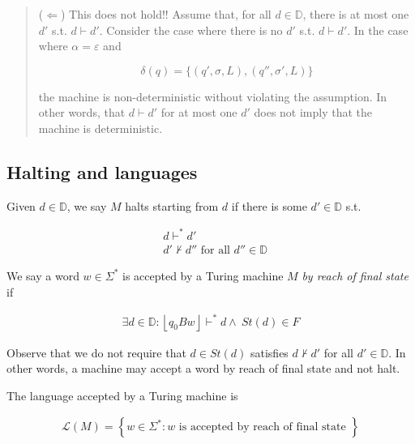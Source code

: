 \documentclass[a4paper, 12pt]{article}
\begin{document}
\begin{quote}
($\Leftarrow$) This does not hold!! Assume that, for all $d \in \mathbb{D}$,
there is at most one $d'$ s.t. $d \vdash d'$. 
 Consider the case where there is no $d'$ s.t. $d \vdash d'$. In the case where
 $\alpha = \varepsilon$ and

$$
\delta(q) = \{ (q', \sigma, L), (q'', \sigma', L) \}
$$

the machine is non-deterministic without violating the assumption. In other
words, that $d \vdash d'$ for at most one $d'$ does not imply that the machine
is deterministic.

\end{quote}
\normalsize


\subsection{Halting and languages}

Given $d \in \mathbb{D}$, we say $M$ halts starting from $d$ if there is some
$d' \in \mathbb{D}$ s.t. 

\begin{align*}
    &d \vdash^* d' \\ 
    &d' \not\vdash d'' \text{ for all } d'' \in \mathbb{D}
\end{align*}

We say a word $w \in \Sigma^{*}$ is accepted by a Turing machine $M$ \textit{by reach of final
state} if

\begin{align*}
    \exists d \in \mathbb{D} : \left\lfloor q_0 B w \right\rfloor \vdash^* d \land ~ St(d) \in F
\end{align*}

Observe that we do not require that $d \in St(d)$ satisfies $d \not\vdash d'$
for all $d' \in \mathbb{D}$. In other words, a machine may accept a word by
reach of final state and not halt.

The language accepted by a Turing machine is 

\begin{align*}
    \mathcal{L}(M) = \left\{w \in \Sigma^{*}:  w \text{ is accepted by reach of final state } \right\} 
\end{align*}
\end{document}
